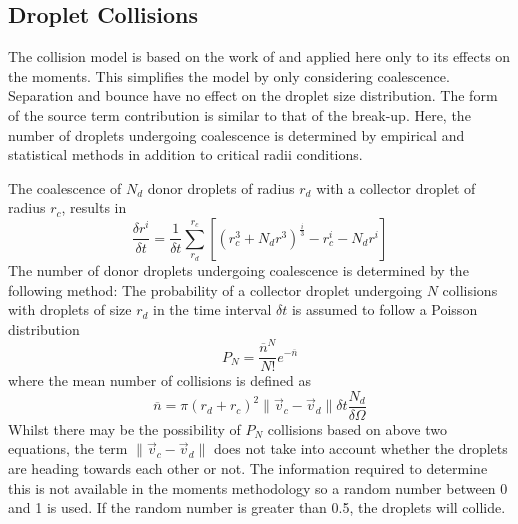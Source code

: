\documentclass[a4paper,10pt]{article}
\begin{document}
\subsection{Droplet Collisions}
The collision model is based on the work of \cite{orourke1981} and applied here only to its effects on the moments.  This simplifies the model by only considering coalescence. Separation and bounce have no effect on the droplet size distribution.  The form of the source term contribution is similar to that of the break-up.  Here, the number of droplets undergoing coalescence is determined by empirical and statistical methods in addition to critical radii conditions.

The coalescence of $N_d$ donor droplets of radius $r_d$ with a collector droplet of radius $r_c$, results in
\begin{equation}
\frac{\delta r^i}{\delta t} = \frac{1}{\delta t}
\sum_{r_d}^{r_c} \left[ (r_c^3 + N_d r^3)^{\frac{i}{3}} - r_c^i - N_d r^i \right] %
\end{equation}
The number of donor droplets undergoing coalescence is determined by the following method:
The probability of a collector droplet undergoing $N$ collisions with droplets of size $r_d$ in the time interval $\delta t$ is assumed to follow a Poisson distribution
\begin{equation}
P_N = \frac{\overline{n}^N}{N!} e^{-\overline{n}}
\end{equation}
where the mean number of collisions is defined as
\begin{equation}
\overline{n} = \pi (r_d + r_c)^2 \parallel \vec{v}_c-\vec{v}_d \parallel \delta t \frac{N_d}{\delta \Omega}
\end{equation}
Whilst there may be the possibility of $P_N$ collisions based on above two equations, the term $\parallel \vec{v}_c-\vec{v}_d \parallel$ does not take into account whether the droplets are heading towards each other or not. The information required to determine this is not available in the moments methodology so a random number between 0 and 1 is used. If the random number is greater than 0.5, the droplets will collide.
\end{document}
